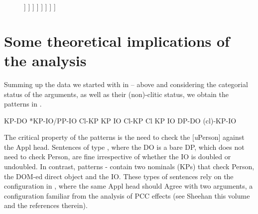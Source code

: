 \documentclass[output=paper,modfonts,nonflat,newtxmath]{langsci/langscibook}
\begin{document}
\begin{figure}%
	\begin{forest}
		[PersP
			[Pers
			]
			[\textit{v}P
				[KP\textsubscript{Theme}
				]
				[\textit{v}P
					[DP\textsubscript{Agent}
					]
					[\textit{v}'
						[\textit{v}
						]
						[V\textsubscript{Appl}P
								[KP\textsubscript{Theme}
								]
								[V'\textsubscript{Appl}
									[V\textsubscript{Appl}
									]
									[VP
										[KP\textsubscript{Goal}
										]
									]
								]
						]
						]
					]
				]
			]
		]
	\end{forest}
	\caption{\label{fig:cornilescu:13} \missingcaption}
\end{figure}


\section{Some theoretical implications of the analysis} %

Summing up the data we started with in  –  above and considering the categorial status of the arguments, as well as their (non)-clitic status, we obtain the patterns in . 

\ea%
   \label{ex:cornilescu:35}
   \ea KP-DO \hspace{1cm} *KP-IO/PP-IO \label{ex:cornilescu:35a}
   \ex Cl-KP \hspace{1cm} KP IO \label{ex:cornilescu:35b}
   \ex Cl-KP \hspace{1cm} Cl KP IO \label{ex:cornilescu:35c}
    \label{ex:cornilescu:35d}
   \ex DP-DO \hspace{1cm} (cl)-KP-IO \label{ex:cornilescu:35e}
   \z
   \z

The critical property of the patterns is the need to check the [\textit{u}Person] against the Appl head. Sentences of type , where the DO is a bare DP, which does not need to check Person, are fine irrespective of whether the IO is doubled or undoubled. In contrast, patterns - contain two nominals (KPs) that check Person, the DOM-ed direct object and the IO. These types of sentences rely on the configuration in , where the same Appl head should Agree with two arguments, a configuration familiar from the analysis of PCC effects (see Sheehan this volume and the references therein). 
\end{document}
